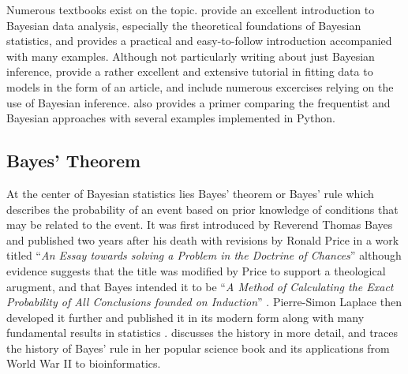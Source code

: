 Numerous textbooks exist on the topic. \citet{Gelman14} provide an excellent introduction to Bayesian data analysis, especially the theoretical foundations of Bayesian statistics, and \citet{Kruschke14} provides a practical and easy-to-follow introduction accompanied with many examples. Although not particularly writing about just Bayesian inference, \citet{Hogg10} provide a rather excellent and extensive tutorial in fitting data to models in the form of an article, and include numerous excercises relying on the use of Bayesian inference. \citet{vanderPlas14} also provides a primer comparing the frequentist and Bayesian approaches with several examples implemented in Python.


\subsection{Bayes' Theorem}
At the center of Bayesian statistics lies Bayes' theorem or Bayes' rule which describes the probability of an event based on prior knowledge of conditions that may be related to the event. It was first introduced by Reverend Thomas Bayes and published two years after his death with revisions by Ronald Price in a work titled ``\textit{An Essay towards solving a Problem in the Doctrine of Chances}'' \citep{Bayes1763} although evidence suggests that the title was modified by Price to support a theological arugment, and that Bayes intended it to be ``\textit{A Method of Calculating the Exact Probability of All Conclusions founded on Induction}'' \citep{Stigler13}. Pierre-Simon Laplace then developed it further and published it in its modern form along with many fundamental results in statistics \citep{Laplace1820}. \citet{Dale99} discusses the history in more detail, and \citet{McGrayne11} traces the history of Bayes' rule in her popular science book and its applications from World War II to bioinformatics.

